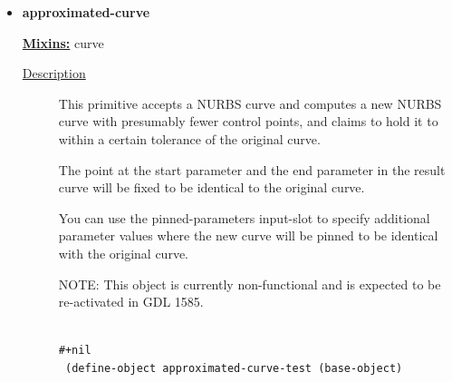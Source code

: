 \documentclass [11pt]{book}
\begin{document}
\begin{itemize}

\item {}
\label{prim:approximated-curve}
\textbf{approximated-curve}


\textbf{
\underline{Mixins:}} curve





\begin{description}

\item [
\underline{Description}]


This primitive accepts a NURBS curve and 
computes a new NURBS curve with presumably fewer control points, and claims
to hold it to within a certain tolerance of the original curve. 

The point at the start parameter and the end parameter in the result 
curve will be fixed to be identical to the original curve. 

You can use the pinned-parameters input-slot to specify additional parameter
values where the new curve will be pinned to be identical with the original curve.

NOTE: This object is currently non-functional and is expected to be
re-activated in GDL 1585.





\end{description}




\begin{figure}
\begin{lrbox}{\boxedverb}
\begin{minipage}{\linewidth}
{\small

\begin{verbatim}

#+nil
 (define-object approximated-curve-test (base-object)
  

\end{verbatim}}
\end{minipage}
\end{lrbox}
\end{figure}
\end{itemize}
\end{document}
